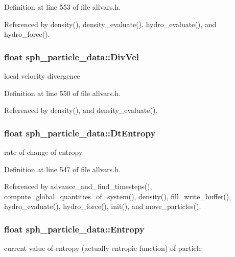 Definition at line 553 of file allvars.h.



Referenced by density(), density\_\-evaluate(), hydro\_\-evaluate(), and hydro\_\-force().

\hypertarget{structsph__particle__data_a1af47e5f5e7ef9e4a656411c468c8d14}{
\subsubsection[{DivVel}]{\setlength{\rightskip}{0pt plus 5cm}float {\bf sph\_\-particle\_\-data::DivVel}}}
\label{structsph__particle__data_a1af47e5f5e7ef9e4a656411c468c8d14}
local velocity divergence 

Definition at line 550 of file allvars.h.



Referenced by density(), and density\_\-evaluate().

\hypertarget{structsph__particle__data_a27aeefa50674867d3dec1c359b7191c8}{
\subsubsection[{DtEntropy}]{\setlength{\rightskip}{0pt plus 5cm}float {\bf sph\_\-particle\_\-data::DtEntropy}}}
\label{structsph__particle__data_a27aeefa50674867d3dec1c359b7191c8}
rate of change of entropy 

Definition at line 547 of file allvars.h.



Referenced by advance\_\-and\_\-find\_\-timesteps(), compute\_\-global\_\-quantities\_\-of\_\-system(), density(), fill\_\-write\_\-buffer(), hydro\_\-evaluate(), hydro\_\-force(), init(), and move\_\-particles().

\hypertarget{structsph__particle__data_a7cbe9bb2086f525f400b2c12103b3116}{
\subsubsection[{Entropy}]{\setlength{\rightskip}{0pt plus 5cm}float {\bf sph\_\-particle\_\-data::Entropy}}}
\label{structsph__particle__data_a7cbe9bb2086f525f400b2c12103b3116}
current value of entropy (actually entropic function) of particle 

